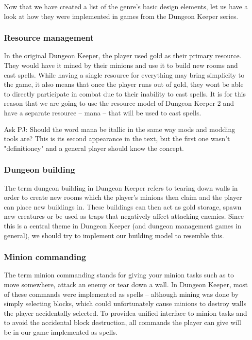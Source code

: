 Now that we have created a list of the genre's basic design elements, let us have a look at how they were implemented in games from the
Dungeon Keeper series.

\subsubsection{Resource management}

In the original Dungeon Keeper, the player used gold as their primary resource. They would have it mined by their minions and use
it to build new rooms and cast spells. While having a single resource for everything may bring simplicity to the game, it also means
that once the player runs out of gold, they wont be able to directly participate in combat due to their inability to cast spells.
It is for this reason that we are going to use the resource model of Dungeon Keeper 2 and have a separate resource -- mana -- that
will be used to cast spells.

\bigskip
Ask PJ: Should the word mana be itallic in the same way mods and modding tools are? This is its second appearance in the text, but the
first one wasn't "definitioney" and a general player should know the concept.

\subsubsection{Dungeon building}

The term dungeon building in Dungeon Keeper refers to tearing down walls in order to create new rooms which the player's minions 
then claim and the player can place new buildings in. These buildings can then act as gold storage, spawn new creatures or be used
as traps that negatively affect attacking enemies. Since this is a central theme in Dungeon Keeper (and dungeon management games
in general), we should try to implement our building model to resemble this.

\subsubsection{Minion commanding}

The term minion commanding stands for giving your minion tasks such as to move somewhere, attack an enemy or tear down a wall. In
Dungeon Keeper, most of these commands were implemented as spells -- although mining was done by simply selecting blocks, which
could unfortunately cause minions to destroy walls the player accidentally selected. To providea unified interface to minion tasks
and to avoid the accidental block destruction, all commands the player can give will be in our game implemented as spells.


